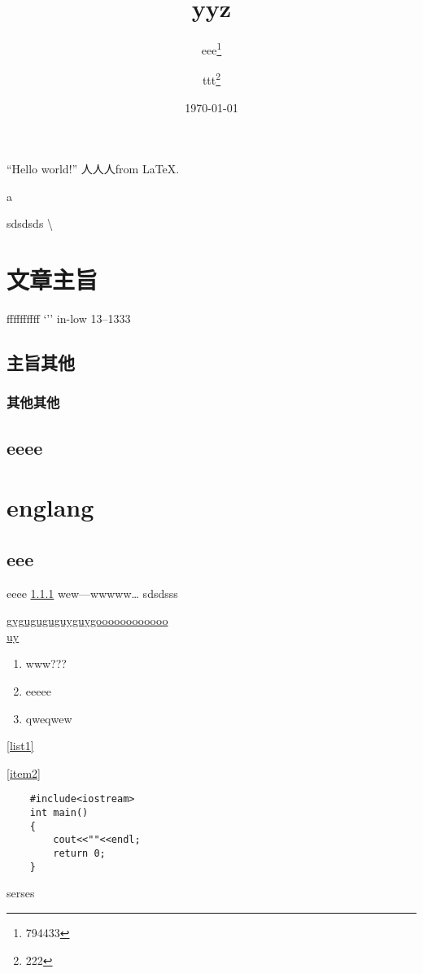 \documentclass[UTF8]{ctexart}
\title{yyz}
\author{eee\thanks{794433}\and ttt\thanks{222}}
\date{\today}
\begin{document}
\maketitle
``Hello world!'' 人人人from \LaTeX.

\tableofcontents

a \par
sdsdsds
\textbackslash

\section{文章主旨}
ffffffffff
`''
in-low
13--1333

\subsection{主旨其他}

\subsubsection{其他其他}
\label{qita}
\subsection{eeee}

\appendix

\section{englang}

\subsection{eee}
eeee 
\ref{qita}
\pageref{qita}
wew---wwwww\ldots
sdsdsss\par
\uline{gyguguguguyguygoooooooooooo
\\ uy}
\begin{enumerate}\label{list1}
    \item www???
    \item eeeee\label{item2}
    \item qweqwew
\end{enumerate}
\ref{list1}

\ref{item2}

\begin{verbatim}
    #include<iostream>
    int main()
    {
        cout<<""<<endl;
        return 0;
    }
\end{verbatim}
\newpage
serses
\end{document}
